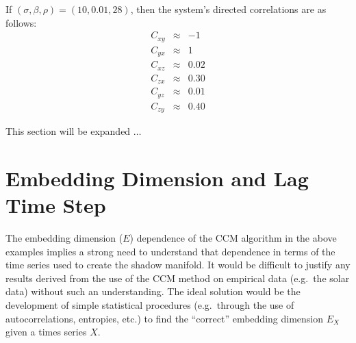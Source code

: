 \documentclass[a4paper,11pt]{article}
\begin{document}
If $(\sigma,\beta,\rho)=(10,0.01,28)$, then the system's directed correlations are as follows:
\begin{eqnarray*}
C_{xy} &\approx & -1\\
C_{yx} &\approx & 1\\
C_{xz} &\approx & 0.02\\
C_{zx} &\approx & 0.30\\
C_{yz} &\approx & 0.01\\
C_{zy} &\approx & 0.40
\end{eqnarray*}

This section will be expanded $\ldots$

\section{Embedding Dimension and Lag Time Step}
The embedding dimension ($E$) dependence of the CCM algorithm in the above examples implies a strong need to understand that dependence in terms of the time series used to create the shadow manifold.  It would be difficult to justify any results derived from the use of the CCM method on empirical data (e.g.\ the solar data) without such an understanding.  The ideal solution would be the development of simple statistical procedures (e.g.\ through the use of autocorrelations, entropies, etc$.$) to find the ``correct'' embedding dimension $E_X$ given a times series $X$.
\end{document}
